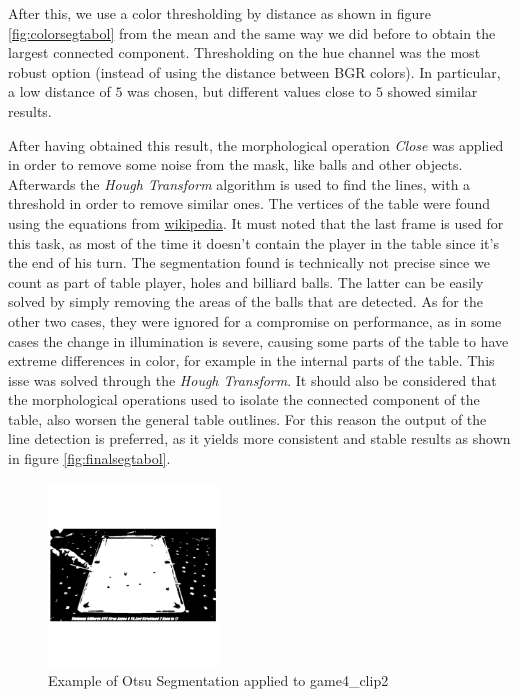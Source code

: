 After this, we use a color thresholding by distance as shown in figure \ref{fig:colorsegtabol} from the mean and the same way we 
did before to obtain the largest connected component. Thresholding on the hue channel
was the most robust option (instead of using the distance between BGR colors). In particular, a low distance of $5$ was chosen, but different values close to $5$ showed similar results.\par
After having obtained this result, the morphological operation \textit{Close} was applied in order to remove some noise from the mask,
like balls and other objects. Afterwards the \textit{Hough Transform} algorithm is used to find the lines, 
with a threshold in order to remove similar ones.
The vertices of the table were found using the equations from \href{https://en.wikipedia.org/wiki/Line\%E2\%80\%93line\_intersection}{wikipedia}.
It must noted that the last frame is used for this task, as most of the time it doesn't contain the player in the table since it's the end of
his turn.
The segmentation found is technically not precise since we count as part of table player, holes and billiard balls. The latter can be easily solved by simply removing the areas of the balls that are detected. 
As for the other two cases, they were ignored for a compromise on performance, as in some
cases the change in illumination is severe, causing some parts of the table to have extreme 
differences in color, for example in the internal parts of the table. This isse was solved through 
the \textit{Hough Transform}.
It should also be considered that the morphological operations used to isolate the connected component of the table, also worsen
the general table outlines. For this reason the output of the line detection is preferred, as it yields
more consistent and stable results as shown in figure \ref{fig:finalsegtabol}.

\begin{figure}[h]
    \centering
    \includegraphics[width=0.4\textwidth]{./imgs/otsu_table.png}
    \caption{Example of Otsu Segmentation applied to game4\_clip2}
    \label{fig:otsutable}
\end{figure}

